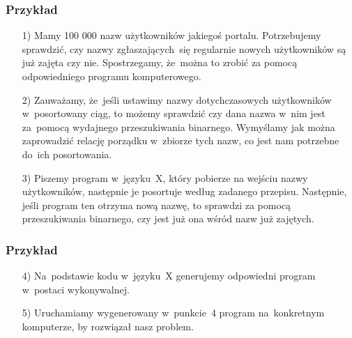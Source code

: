 \documentclass[10pt,t]{beamer}
\begin{document}
\begin{frame}
  \frametitle{Przykład}


  \begin{itemize}

  \item[1)] Mamy 100 000 nazw użytkowników jakiegoś portalu. Potrzebujemy
    sprawdzić, czy nazwy zgłaszających~się regularnie nowych użytkowników
    są już zajęta czy nie. Spostrzegamy, że~można to zrobić za pomocą
    odpowiedniego programu komputerowego.



  \item[2)] Zauważamy, że~jeśli ustawimy nazwy dotychczasowych użytkowników
    w~posortowany ciąg, to możemy sprawdzić czy dana nazwa w~nim jest
    za~pomocą wydajnego przeszukiwania binarnego. Wymyślamy jak można
    zaprowadzić relację porządku w~zbiorze tych nazw, co jest nam potrzebne
    do~ich posortowania.



  \item[3)] Piszemy program w~języku~X, który pobierze na wejściu nazwy
    użytkowników, następnie je posortuje według zadanego przepisu.
    Następnie, jeśli program ten otrzyma nową nazwę, to sprawdzi za pomocą
    przeszukiwania binarnego, czy jest już ona wśród nazw już zajętych.

  \end{itemize}

\end{frame}





\begin{frame}
  \frametitle{Przykład}


  \begin{itemize}

  \item[4)] Na~podstawie kodu w~języku~X generujemy odpowiedni program
    w~postaci wykonywalnej.



  \item[5)] Uruchamiamy wygenerowany w~punkcie~4 program na~konkretnym
    komputerze, by rozwiązał nasz problem.

  \end{itemize}

\end{frame}
\end{document}
